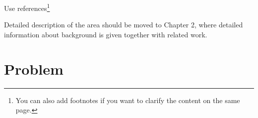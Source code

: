 Use references\footnote{You can also add footnotes if you want to clarify the content on the same page.}

Detailed description of the area should be moved to Chapter 2, where detailed information about background is given together with related work.



%

\section{Problem}





